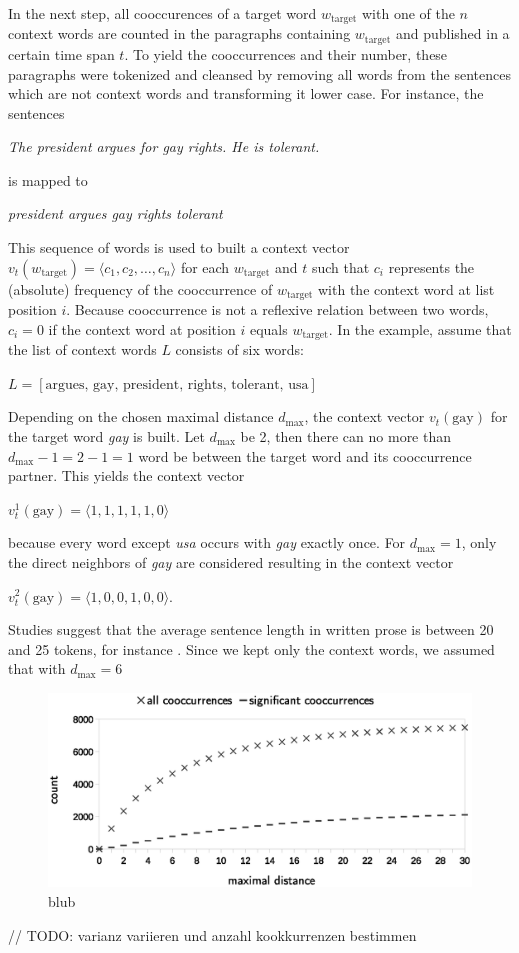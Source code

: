 \documentclass[10pt,a4paper,twocolumn]{scrartcl}
\begin{document}
In the next step, all cooccurences of a target word $w_\text{target}$ with one of the $n$ context words are counted in the paragraphs containing $w_\text{target}$ and published in a certain time span $t$. To yield the cooccurrences and their number, these paragraphs were tokenized and cleansed by removing all words from the sentences which are not context words and transforming it lower case. For instance, the sentences \begin{center}\textit{The president argues for gay rights. He is tolerant.}\end{center} is mapped to \begin{center}\textit{president argues gay rights tolerant}\end{center} This sequence of words is used to built a context vector $v_t(w_\text{target}) = \langle c_1, c_2, \ldots, c_n\rangle$ for each $w_\text{target}$ and $t$ such that $c_i$ represents the (absolute) frequency of the cooccurrence of $w_\text{target}$ with the context word at list position $i$. Because cooccurrence is not a reflexive relation between two words, $c_i = 0$ if the context word at position $i$ equals $w_\text{target}$. In the example, assume that the list of context words $L$ consists of six words: \begin{center}$L =  [\text{argues, gay, president, rights, tolerant, usa}]$\end{center} Depending on the chosen maximal distance $d_\text{max}$, the context vector $v_t(\text{gay})$ for the target word \textit{gay} is built. Let $d_\text{max}$ be 2, then there can no more than $d_\text{max} - 1 = 2 - 1 = 1$ word be between the target word and its cooccurrence partner. This yields the context vector \begin{center}$v_t^1(\text{gay}) = \langle 1, 1, 1, 1, 1, 0\rangle$\end{center} because every word except \textit{usa} occurs with \textit{gay} exactly once. For $d_\text{max} = 1$, only the direct neighbors of \textit{gay} are considered resulting in the context vector \begin{center}$v_t^2(\text{gay}) = \langle 1, 0, 0, 1, 0, 0\rangle$.\end{center} Studies suggest that the average sentence length in written prose is between 20 and 25 tokens, for instance \citep{Sichel:1974}. Since we kept only the context words, we assumed that with $d_\text{max} = 6$


\begin{figure}
\includegraphics[width=\columnwidth]{figures/distance_eps}
\caption{blub}
\end{figure}
// TODO: varianz variieren und anzahl kookkurrenzen bestimmen
\end{document}
